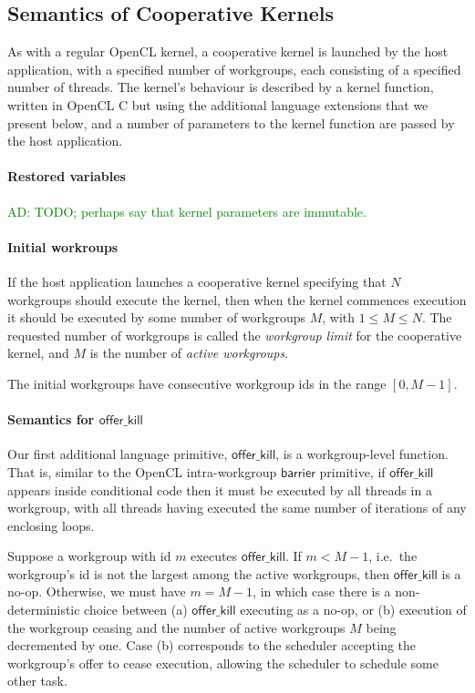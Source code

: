 \documentclass[nocopyrightspace]{sigplanconf-pldi16}
\newcommand{\ADComment}[1]{\textcolor{green}{AD: #1}}
\newcommand{\offerkill}{\mathsf{offer\_kill}}
\begin{document}
\subsection{Semantics of Cooperative Kernels}

As with a regular OpenCL kernel, a cooperative kernel is launched by
the host application, with a specified number of workgroups, each
consisting of a specified number of threads.  The kernel's behaviour
is described by a kernel function, written in OpenCL C but using the
additional language extensions that we present below, and a number of
parameters to the kernel function are passed by the host application.

\paragraph{Restored variables}

\ADComment{TODO; perhaps say that kernel parameters are immutable.}

\paragraph{Initial workroups}

If the host application launches a cooperative kernel specifying that
$N$ workgroups should execute the kernel, then when the kernel
commences execution it should be executed by some number of workgroups
$M$, with $1\leq M \leq N$.  The requested number of workgroups is
called the \emph{workgroup limit} for the cooperative kernel, and $M$
is the number of \emph{active workgroups}.

The initial workgroups have consecutive workgroup ids in the range
$[0, M-1]$.

\paragraph{Semantics for $\offerkill$}

Our first additional language primitive, $\offerkill$, is a
workgroup-level function.  That is, similar to the OpenCL
intra-workgroup $\mathsf{barrier}$ primitive, if $\offerkill$ appears
inside conditional code then it must be executed by all threads in a
workgroup, with all threads having executed the same number of
iterations of any enclosing loops.

Suppose a workgroup with id $m$ executes $\offerkill$.  If $m < M-1$,
i.e.\ the workgroup's id is not the largest among the active
workgroups, then $\offerkill$ is a no-op.  Otherwise, we must have $m
= M-1$, in which case there is a non-deterministic choice between (a)
$\offerkill$ executing as a no-op, or (b) execution of the workgroup
ceasing and the number of active workgroups $M$ being decremented by
one.  Case (b) corresponds to the scheduler accepting the workgroup's
offer to cease execution, allowing the scheduler to schedule some
other task.
\end{document}
